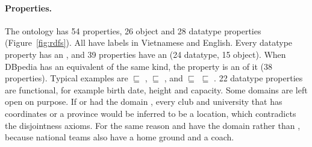 \paragraph{Properties.} The ontology has 54 properties, 26 object and 28
datatype properties (Figure~\ref{fig:rdfs}). All have labels in Vietnamese and
English. Every datatype property has an , and 39 properties
have an  (24 datatype, 15 object). When DBpedia has an
equivalent of the same kind, the property is an  of it
(38 properties). Typical examples are
 $\sqsubseteq$ ,
 $\sqsubseteq$ , and
 $\sqsubseteq$  $\sqsubseteq$
. 22 datatype properties are functional, for example
birth date, height and capacity. Some domains are left open on purpose. If
 or  had the domain ,
every club and university that has coordinates or a province would be
inferred to be a location, which contradicts the disjointness axioms. For the
same reason  and  have the domain
 rather than , because national teams
also have a home ground and a coach.

